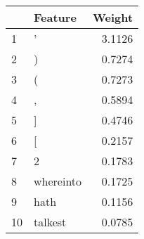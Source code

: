 \begin{tabular}{llr}
\toprule
{} &    Feature &  Weight \\
\midrule
1  &          ' &  3.1126 \\
2  &          ) &  0.7274 \\
3  &          ( &  0.7273 \\
4  &          , &  0.5894 \\
5  &          ] &  0.4746 \\
6  &          [ &  0.2157 \\
7  &          2 &  0.1783 \\
8  &  whereinto &  0.1725 \\
9  &       hath &  0.1156 \\
10 &    talkest &  0.0785 \\
\bottomrule
\end{tabular}
